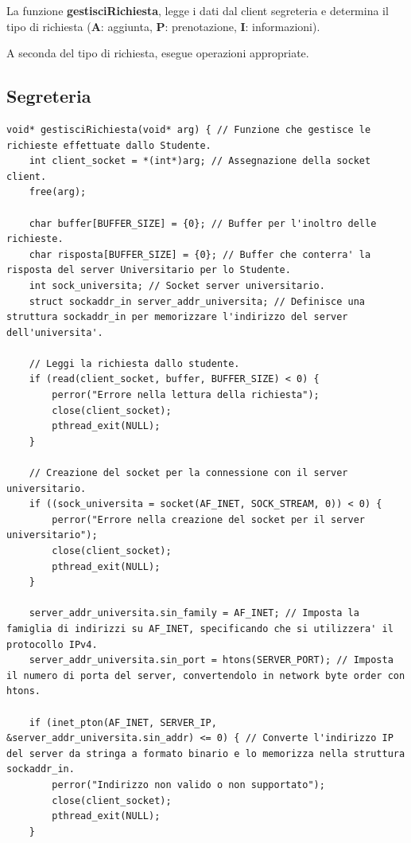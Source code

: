 \documentclass[12pt]{article}
\begin{document}
La funzione \textbf{gestisciRichiesta}, legge i dati dal client segreteria e determina il tipo di richiesta (\textbf{A}: aggiunta, \textbf{P}: prenotazione, \textbf{I}: informazioni).

A seconda del tipo di richiesta, esegue operazioni appropriate.

\newpage

\subsection{Segreteria}

\begin{lstlisting}[style=CStyle]
void* gestisciRichiesta(void* arg) { // Funzione che gestisce le richieste effettuate dallo Studente.
    int client_socket = *(int*)arg; // Assegnazione della socket client.
    free(arg);

    char buffer[BUFFER_SIZE] = {0}; // Buffer per l'inoltro delle richieste.
    char risposta[BUFFER_SIZE] = {0}; // Buffer che conterra' la risposta del server Universitario per lo Studente.
    int sock_universita; // Socket server universitario.
    struct sockaddr_in server_addr_universita; // Definisce una struttura sockaddr_in per memorizzare l'indirizzo del server dell'universita'.

    // Leggi la richiesta dallo studente.
    if (read(client_socket, buffer, BUFFER_SIZE) < 0) {
        perror("Errore nella lettura della richiesta");
        close(client_socket);
        pthread_exit(NULL);
    }

    // Creazione del socket per la connessione con il server universitario.
    if ((sock_universita = socket(AF_INET, SOCK_STREAM, 0)) < 0) {
        perror("Errore nella creazione del socket per il server universitario");
        close(client_socket);
        pthread_exit(NULL);
    }

    server_addr_universita.sin_family = AF_INET; // Imposta la famiglia di indirizzi su AF_INET, specificando che si utilizzera' il protocollo IPv4.
    server_addr_universita.sin_port = htons(SERVER_PORT); // Imposta il numero di porta del server, convertendolo in network byte order con htons.

    if (inet_pton(AF_INET, SERVER_IP, &server_addr_universita.sin_addr) <= 0) { // Converte l'indirizzo IP del server da stringa a formato binario e lo memorizza nella struttura sockaddr_in.
        perror("Indirizzo non valido o non supportato");
        close(client_socket);
        pthread_exit(NULL);
    }


\end{lstlisting}
\end{document}
